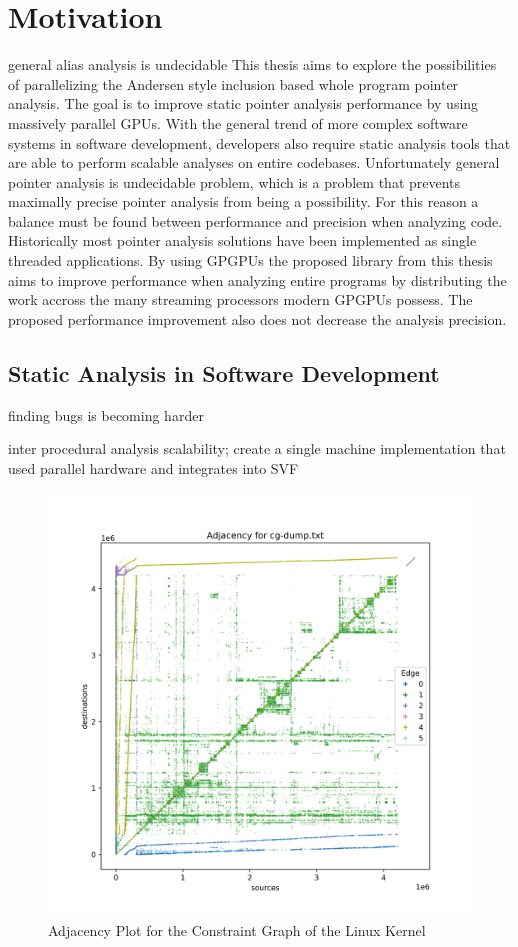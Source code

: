 \section{Motivation}
general alias analysis is undecidable
This thesis aims to explore the possibilities of parallelizing the Andersen style inclusion based whole program pointer analysis. The goal is to improve static pointer analysis performance by using massively parallel GPUs.
With the general trend of more complex software systems in software development, developers also require static analysis tools that are able to perform scalable analyses on entire codebases.
Unfortunately general pointer analysis is undecidable problem, which is a problem that prevents maximally precise pointer analysis from being a possibility.
For this reason a balance must be found between performance and precision when analyzing code.
Historically most pointer analysis solutions have been implemented as single threaded applications. By using GPGPUs the proposed library from this thesis aims to improve performance when analyzing entire programs by distributing the work accross the many streaming processors modern GPGPUs possess. The proposed performance improvement also does not decrease the analysis precision.
\subsection{Static Analysis in Software Development}
finding bugs is becoming harder

inter procedural analysis scalability; create a single machine implementation that used parallel hardware and integrates into SVF

\begin{figure}
    \centering
    \includegraphics[width=1.\textwidth]{img/linux-consg-min.png}
    \caption{Adjacency Plot for the Constraint Graph of the Linux Kernel}
    \label{fig:linux-consg}
\end{figure}


